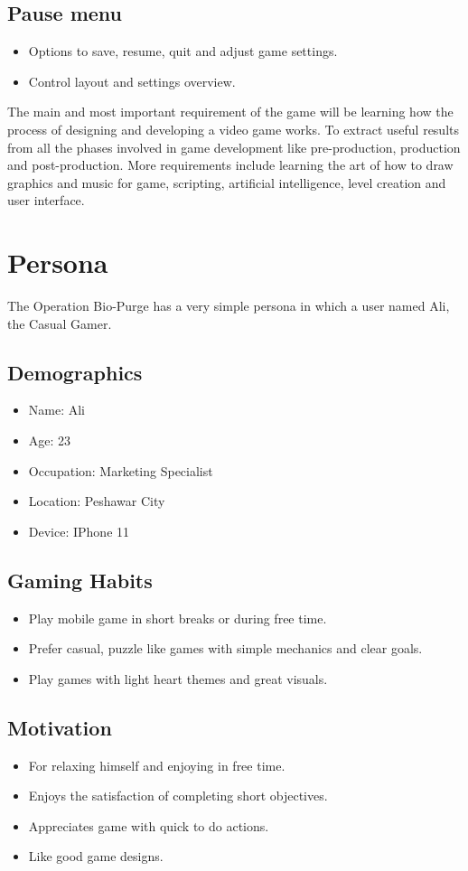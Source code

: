 \subsection{Pause menu}
\begin{itemize}
	\item 	Options to save, resume, quit and adjust game settings.
	\item 	Control layout and settings overview.
\end{itemize}
The main and most important requirement of the game will be learning how the process of designing and developing a video game works. To extract useful results from all the phases involved in game development like pre-production, production and post-production. More requirements include learning the art of how to draw graphics and music for game, scripting, artificial intelligence, level creation and user interface.

\section{Persona}
The Operation Bio-Purge has a very simple persona in which a user named Ali, the Casual Gamer.
\subsection{Demographics}
\begin{itemize}
	\item 	Name: Ali
	\item 	Age: 23
	\item 	Occupation: Marketing Specialist
	\item   Location: Peshawar City
	\item 	Device: IPhone 11
\end{itemize}
\subsection{Gaming Habits}
\begin{itemize}
	\item 	Play mobile game in short breaks or during free time.
	\item 	Prefer casual, puzzle like games with simple mechanics and clear goals.
	\item 	Play games with light heart themes and great visuals.
\end{itemize}
\subsection{Motivation}
\begin{itemize}
	\item For relaxing himself and enjoying in free time.
	\item 	Enjoys the satisfaction of completing short objectives.
	\item	Appreciates game with quick to do actions.
	\item 	Like good game designs.
\end{itemize}
